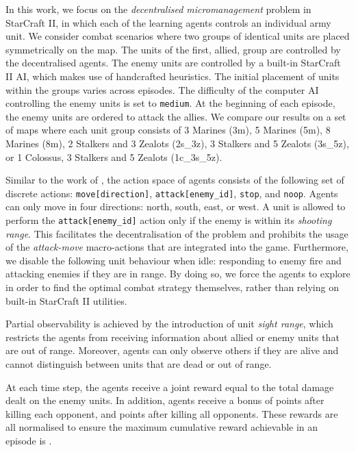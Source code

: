 \documentclass{article}
\begin{document}
In this work, we focus on the \textit{decentralised micromanagement} problem in StarCraft II, in which each of the learning agents controls an individual army unit. 
We consider combat scenarios where two groups of identical units are placed symmetrically on the map. 
The units of the first, allied, group are controlled by the decentralised agents.  
The enemy units are controlled by a built-in StarCraft II AI, which makes use of handcrafted heuristics. 
The initial placement of units within the groups varies across episodes.  
The difficulty of the computer AI controlling the enemy units is set to \texttt{medium}.
At the beginning of each episode, the enemy units are ordered to attack the allies.
We compare our results on a set of maps where each unit group consists of 3 Marines (3m), 5 Marines (5m), 8 Marines (8m), 2 Stalkers and 3 Zealots (2s\_3z), 3 Stalkers and 5 Zealots (3s\_5z), or 1 Colossus, 3 Stalkers and 5 Zealots (1c\_3s\_5z).

Similar to the work of \citet{foerster_counterfactual_2017}, the action space of agents consists of the following set of discrete actions: \texttt{move[direction]}, \texttt{attack[enemy\_id]}, \texttt{stop}, and
\texttt{noop}. 
Agents can only move in four directions: north, south, east, or west.
A unit is allowed to perform the \texttt{attack[enemy\_id]} action only if the 
enemy is within its \textit{shooting range}. 
This facilitates the decentralisation of the problem and prohibits the usage of the \emph{attack-move} macro-actions that are integrated into the game. 
Furthermore, we disable the following unit behaviour when idle: responding to enemy fire and attacking enemies if they are in range. 
By doing so, we force the agents to explore in order to find the optimal combat strategy themselves, rather than relying on built-in StarCraft II utilities.

Partial observability is achieved by the introduction of unit \textit{sight range}, which restricts the agents from receiving information about allied or enemy units that are out of range. 
Moreover, agents can only observe others if they are alive and cannot distinguish between units that are dead or out of range.



At each time step, the agents receive a joint reward equal to the total damage dealt on the enemy units. 
In addition, agents receive a bonus of  points after killing each opponent, and  points after killing all opponents. These rewards are all normalised to ensure the maximum cumulative reward achievable in an episode is .
\end{document}
